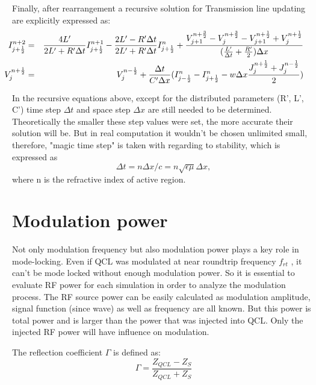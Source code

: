 \documentclass[11pt,final]{scrbook}
\begin{document}
Finally, after rearrangement a recursive solution for Transmission line updating are explicitly expressed as:
\begin{eqnarray}
 \hspace{-8mm} { I }_{ j+\frac{1}{2} }^{ n+2 } &=& \frac { 4L' }{ 2L'+R'\Delta t }{ I }_{ j+\frac{1}{2} }^{ n+1 }-\frac { 2L'-R'\Delta t }{ 2L'+R'\Delta t }{ I }_{ j+\frac{1}{2} }^{ n }+\frac { { V }_{ j+1 }^{ n+\frac{3}{2} }-{ V }_{ j }^{ n+\frac{3}{2}}-{ V }_{ j+1 }^{ n+\frac{1}{2} }+{ V }_{ j }^{ n+\frac{1}{2} } }{  (\frac { L' }{ \Delta t } +\frac { R' }{ 2 })\Delta x }\label{eq:TL_I}\\
 \hspace{-8mm} { V }_{ j }^{ n+\frac{1}{2} } &=& { V }_{ j }^{ n-\frac{1}{2} } + \frac{ \Delta t }{ C'\Delta x } ({ I }_{ j-\frac{1}{2} }^{ n}-{ I }_{ j+\frac{1}{2} }^{ n } - w\Delta x\frac{{J}_{j}^{n+\frac{1}{2}}+{J}_{j}^{n-\frac{1}{2}}}{2}) \label{eq:TL_U}
\end{eqnarray}

In the recursive equations above, except for the distributed parameters (R', L', C') time step $\Delta t$ and space step $\Delta x$ are still needed to be determined. Theoretically the smaller these step values were set, the more accurate their solution will be. But in real computation it wouldn't be chosen unlimited small, therefore, "magic time step" \cite{li1992simulation} is taken with regarding to stability, which is expressed as
\begin{equation}
\Delta t=n\Delta x/c=n\sqrt{\epsilon \mu}\Delta x,
\end{equation}
where n is the refractive index of active region.
\section{Modulation power}
Not only modulation frequency but also modulation power plays a key role in mode-locking. Even if QCL was modulated at near roundtrip frequency $f_{rt}$ , it can't be mode locked without enough modulation power. So it is essential to evaluate RF power for each simulation in order to analyze the modulation process. The RF source power can be easily calculated as modulation amplitude, signal function (since wave) as well as frequency are all known. But this power is total power and is larger than the power that was injected into QCL. Only the injected RF power will have influence on modulation.

The reflection coefficient $\Gamma$ is defined as:
\begin{equation}
\Gamma = \frac{Z_{QCL}-Z_{S}}{Z_{QCL}+Z_{S}}
\end{equation}
\end{document}
